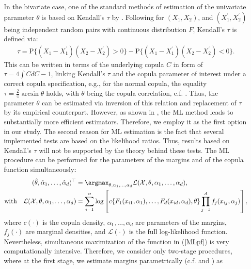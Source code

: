 In the bivariate case, one of the standard methods of estimation of the univariate parameter $\theta$ is based on Kendall's $\tau$ by \citet{genest_rivest_1993}. Following \citet{joe_1997} for $(X_1, X_2)$, and $(X_1^{'},X_2^{'})$ being independent random pairs with continuous distribution $F$, Kendall's $\tau$ is defined via:
\begin{align*}
    \tau = \text{P} \{ (X_1 - X_1^{'})(X_2 - X_2^{'}) > 0\} - \text{P}\{ (X_1 - X_1^{'})(X_2 - X_2^{'}) < 0\}.
\end{align*}
This can be written in terms of the underlying copula $C$ in form of $\tau = 4 \int C dC - 1$, linking Kendall's $\tau$ and the copula parameter of interest under a correct copula specification, e.g., for the normal copula, the equality $\tau = \frac{2}{\pi} \arcsin \theta$ holds, with $\theta$ being the copula correlation, c.f. \citet{demarta_mcneil_2004}. Thus, the parameter $\theta$ can be estimated via inversion of this relation and replacement of $\tau$ by its empirical counterpart. However, as shown in \citet{genest_ghoudi_rivest_1995}, the ML method leads to substantially more efficient estimators. Therefore, we employ it as the first option in our study. The second reason for ML estimation is the fact that several implemented tests are based on the likelihood ratios. Thus, results based on Kendall's $\tau$ will not be supported by the theory behind these tests. The ML procedure can be performed for the parameters of the margins and of the copula function simultaneously:
\begin{align} \label{MLpf}
            (\hat\theta, \hat\alpha_1, \ldots, \hat\alpha_d)^\top &= \argmax_{\theta, \alpha_1, \ldots, \alpha_d}\mathcal{L}(\mathcal{X}, \theta, \alpha_1, \ldots, \alpha_d), \\
            \text{with}\quad
            \mathcal{L}(\mathcal{X}, \theta, \alpha_1, \ldots, \alpha_d) &= \sum_{i=1}^n
            \log \left[
            c\{F_1(x_{i1},\alpha_1),\dots,F_d(x_{id},\alpha_d),\theta\}\prod_{j=1}^df_j(x_{ij},\alpha_j)\right] \nonumber,\\
\end{align}
where $c(\cdot)$ is the copula density, $\alpha_1, \ldots, \alpha_d$ are parameters of the margins, $f_{j}(\cdot)$ are marginal densities, and $\mathcal{L}(\cdot)$ is the full log-likelihood function. Nevertheless, simultaneous maximization of the function in (\ref{MLpf}) is very computationally intensive. Therefore, we consider only two-stage procedures, where at the first stage, we estimate margins parametrically (c.f. \citet{joe_1997} and \citet{joe_2005}) as
